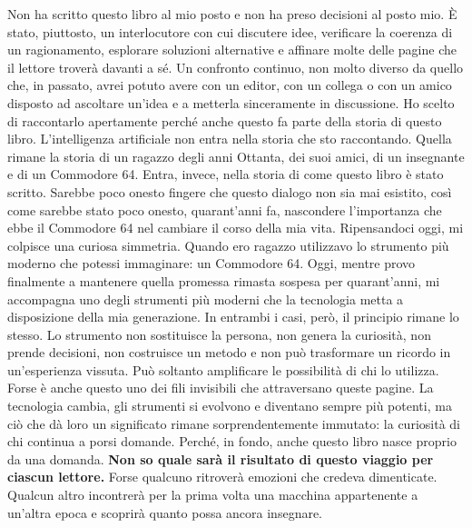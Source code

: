 \documentclass{article}
\begin{document}
Non ha scritto questo libro al mio posto e non ha preso decisioni al posto mio. È stato, piuttosto, un interlocutore con
cui discutere idee, verificare la coerenza di un ragionamento, esplorare soluzioni alternative e affinare molte delle
pagine che il lettore troverà davanti a sé. Un confronto continuo, non molto diverso da quello che, in passato, avrei
potuto avere con un editor, con un collega o con un amico disposto ad ascoltare un'idea e a metterla sinceramente in
discussione.\newline
Ho scelto di raccontarlo apertamente perché anche questo fa parte della storia di questo libro.\newline
L'intelligenza artificiale non entra nella storia che sto raccontando. Quella rimane la storia di un ragazzo degli anni
Ottanta, dei suoi amici, di un insegnante e di un Commodore 64. Entra, invece, nella storia di come questo libro è
stato scritto. Sarebbe poco onesto fingere che questo dialogo non sia mai esistito, così come sarebbe stato poco
onesto, quarant'anni fa, nascondere l'importanza che ebbe il Commodore 64 nel cambiare il corso della mia vita.\newline
Ripensandoci oggi, mi colpisce una curiosa simmetria. Quando ero ragazzo utilizzavo lo strumento più moderno che potessi
immaginare: un Commodore 64. Oggi, mentre provo finalmente a mantenere quella promessa rimasta sospesa per
quarant'anni, mi accompagna uno degli strumenti più moderni che la tecnologia metta a disposizione della mia
generazione.\newline
In entrambi i casi, però, il principio rimane lo stesso. Lo strumento non sostituisce la persona, non genera la
curiosità, non prende decisioni, non costruisce un metodo e non può trasformare un ricordo in un'esperienza vissuta.
Può soltanto amplificare le possibilità di chi lo utilizza.\newline
Forse è anche questo uno dei fili invisibili che attraversano queste pagine. La tecnologia cambia, gli strumenti si
evolvono e diventano sempre più potenti, ma ciò che dà loro un significato rimane sorprendentemente immutato: la
curiosità di chi continua a porsi domande. Perché, in fondo, anche questo libro nasce proprio da una domanda.\newline
\textbf{Non so quale sarà il risultato di questo viaggio per ciascun lettore.}\newline
Forse qualcuno ritroverà emozioni che credeva dimenticate. Qualcun altro incontrerà per la prima volta una macchina
appartenente a un'altra epoca e scoprirà quanto possa ancora insegnare.\newline
\end{document}

